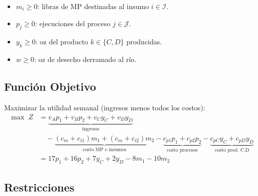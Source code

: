 \documentclass[12pt,a4paper]{article}
\begin{document}
\begin{varbox}
\begin{itemize}[leftmargin=1.5em]
  \item $m_i \geq 0$: libras de MP destinadas al insumo $i \in \mathcal{I}$.
  \item $p_j \geq 0$: ejecuciones del proceso $j \in \mathcal{J}$.
  \item $y_k \geq 0$: oz del producto $k \in \{C, D\}$ producidas.
  \item $w \geq 0$: oz de desecho derramado al río.
\end{itemize}
\end{varbox}

\subsection{Función Objetivo}

\begin{fobox}
Maximizar la utilidad semanal (ingresos menos todos los costos):
\begin{align*}
  \max\;Z &= \underbrace{v_A p_1 + v_B p_2 + v_C y_C + v_D y_D}_{\text{ingresos}}\\
          &\quad - \underbrace{(c_m + c_{i1})m_1 + (c_m + c_{i2})m_2}_{\text{costo MP e insumos}}
             - \underbrace{c_{p1} p_1 + c_{p2} p_2}_{\text{costo procesos}}
             - \underbrace{c_{pC} y_C + c_{pD} y_D}_{\text{costo prod.\ C,D}}\\[6pt]
          &= 17p_1 + 16p_2 + 7y_C + 2y_D - 8m_1 - 10m_2
\end{align*}
\end{fobox}

\subsection{Restricciones}
\end{document}
